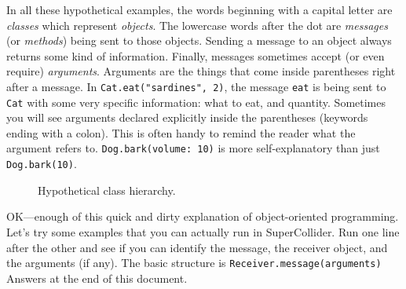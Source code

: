 In all these hypothetical examples, the words beginning with a capital letter are \emph{classes} which represent \emph{objects}. The lowercase words after the dot are \emph{messages} (or \emph{methods}) being sent to those objects. Sending a message to an object always returns some kind of information. Finally, messages sometimes accept (or even require) \emph{arguments}. Arguments are the things that come inside parentheses right after a message. In \texttt{Cat.eat("sardines", 2)}, the message \texttt{eat} is being sent to \texttt{Cat} with some very specific information: what to eat, and quantity. Sometimes you will see arguments declared explicitly inside the parentheses (keywords ending with a colon). This is often handy to remind the reader what the argument refers to. \texttt{Dog.bark(volume: 10)} is more self-explanatory than just \texttt{Dog.bark(10)}.

\begin{figure}[h]
\centerline{}
\caption{Hypothetical class hierarchy.}
\label{fig:animal-class-chart}
\end{figure}

OK---enough of this quick and dirty explanation of object-oriented programming. Let's try some examples that you can actually run in SuperCollider. Run one line after the other and see if you can identify the message, the receiver object, and the arguments (if any). The basic structure is \texttt{Receiver.message(arguments)} Answers at the end of this document.

